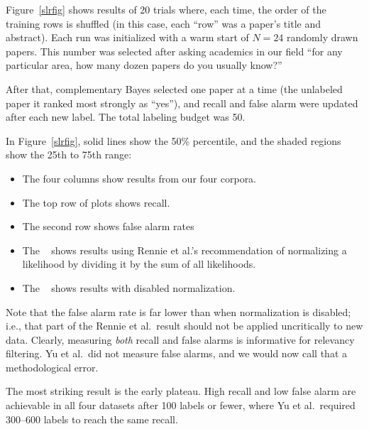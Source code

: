 \documentclass[AMA,STIX2COL]{WileyNJDv5}
\begin{document}
{





 Figure~\ref{slrfig} shows results of 20 trials where,
each time, the order of the training rows is shuffled
(in this case, each ``row'' was a paper's title and abstract).
Each run was initialized with a warm start of $N=24$ randomly drawn papers. 
This number was selected after asking academics in our field ``for any particular area, how many dozen papers do you usually
know?''

After that,
complementary Bayes selected one paper at a time (the unlabeled paper
it ranked most strongly as ``yes''), and recall and false alarm were
updated after each new label. The total labeling budget was 50. 


 

In  Figure~\ref{slrfig}, 
solid lines show the 50\% percentile, and the shaded
regions show the 25th to 75th range:
\begin{itemize}
\item
The four columns show results from our four 
corpora.
\item
The top row
of plots shows recall.
\item
The second row shows  false alarm rates
\item The 
 \color{ruby}{\bf red lines}\color{black}~ shows results using
 Rennie et al.'s recommendation of normalizing a likelihood
 by dividing it by the sum of all likelihoods.
 \item
 The  \color{slateblue}{\bf blue lines}\color{black}~
 shows results with disabled normalization.
 \end{itemize}
Note that the false alarm rate is far lower than
 when normalization is disabled; i.e., that part of
 the Rennie et al.\ result should not be applied
 uncritically to new data.
Clearly,  measuring {\em both} recall and false
alarms is informative for relevancy filtering.
 Yu et al.\ did not measure false alarms, and we would now
 call that a methodological error.
  
The most striking result is the early plateau. High recall
and low false alarm are achievable in all four datasets
after 100 labels or fewer, where Yu et al.\ required
300--600 labels to reach the same recall.

}
\end{document}
